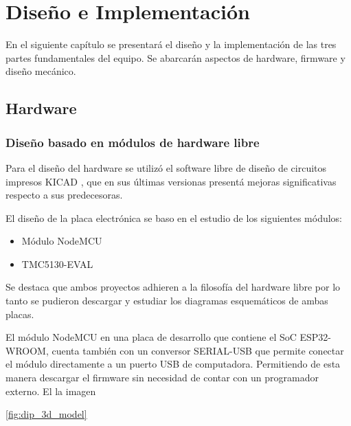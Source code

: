 
\chapter{Diseño e Implementación} %

\label{Chapter3} %

En el siguiente capítulo se presentará el diseño y la implementación de las tres partes fundamentales del equipo. Se abarcarán aspectos de hardware, firmware y diseño mecánico.
\section{Hardware}
\subsection{Diseño basado en módulos de hardware libre}

Para el diseño del hardware se utilizó el software libre de diseño de circuitos impresos KICAD \citep{web_kicad}, que en sus últimas versionas presentá mejoras significativas respecto a sus predecesoras.

El diseño de la placa electrónica se baso en el estudio de los siguientes módulos:

\begin{itemize}
\item Módulo NodeMCU \citep{web_nodemcu}
\item TMC5130-EVAL \citep{3_web_trinamic_placa}	
\end{itemize}

Se destaca que ambos proyectos adhieren a la filosofía del hardware libre por lo tanto se pudieron descargar y estudiar los diagramas esquemáticos de ambas placas. 


El módulo NodeMCU en una placa de desarrollo que contiene el SoC ESP32-WROOM, cuenta también con un conversor SERIAL-USB que permite conectar el módulo directamente a un puerto USB de computadora. Permitiendo de esta manera descargar el firmware sin necesidad de contar con un programador externo.
El la imagen 

\ref{fig:dip_3d_model}


